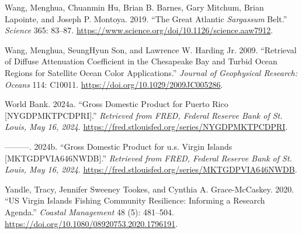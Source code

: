 \documentclass[
  letterpaper,
  oneside,
  open=any]{scrbook}
\newlength{\cslhangindent}
\newenvironment{CSLReferences}[2] %
 {\begin{list}{}{%
  \setlength{\itemindent}{0pt}
  \setlength{\leftmargin}{0pt}
  \setlength{\parsep}{0pt}
  \ifodd #1
   \setlength{\leftmargin}{\cslhangindent}
   \setlength{\itemindent}{-1\cslhangindent}
  \fi
  \setlength{\itemsep}{#2\baselineskip}}}
 {\end{list}}
\begin{document}
\begin{CSLReferences}{1}{0}
Wang, Menghua, Chuanmin Hu, Brian B. Barnes, Gary Mitchum, Brian
Lapointe, and Joseph P. Montoya. 2019. {``The Great Atlantic
{\emph{Sargassum}} Belt.''} \emph{Science} 365: 83--87.
\url{https://www.science.org/doi/10.1126/science.aaw7912}.

Wang, Menghua, SeungHyun Son, and Lawrence W. Harding Jr. 2009.
{``Retrieval of Diffuse Attenuation Coefficient in the Chesapeake Bay
and Turbid Ocean Regions for Satellite Ocean Color Applications.''}
\emph{Journal of Geophysical Research: Oceans} 114: C10011.
\url{https://doi.org/10.1029/2009JC005286}.

World Bank. 2024a. {``Gross Domestic Product for Puerto Rico
{[}NYGDPMKTPCDPRI{]}.''} \emph{Retrieved from FRED, Federal Reserve Bank
of St. Louis, May 16, 2024}.
\url{https://fred.stlouisfed.org/series/NYGDPMKTPCDPRI}.

---------. 2024b. {``Gross Domestic Product for u.s. Virgin Islands
{[}MKTGDPVIA646NWDB{]}.''} \emph{Retrieved from FRED, Federal Reserve
Bank of St. Louis, May 16, 2024}.
\url{https://fred.stlouisfed.org/series/MKTGDPVIA646NWDB}.

Yandle, Tracy, Jennifer Sweeney Tookes, and Cynthia A. Grace-McCaskey.
2020. {``US Virgin Islands Fishing Community Resilience: Informing a
Research Agenda.''} \emph{Coastal Management} 48 (5): 481--504.
\url{https://doi.org/10.1080/08920753.2020.1796191}.

\end{CSLReferences}


\backmatter
\end{document}
